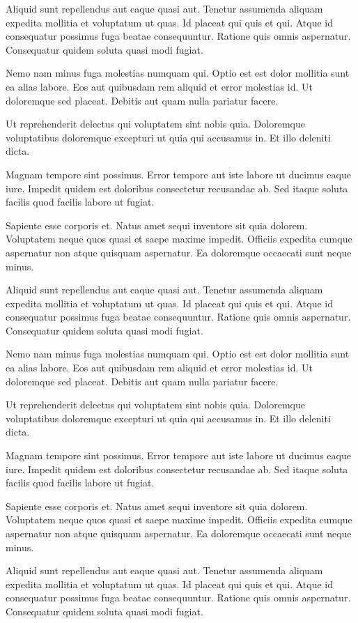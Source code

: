 \documentclass[../Main.tex]{subfiles}
\begin{document}
    Aliquid sunt repellendus aut eaque quasi aut. Tenetur assumenda aliquam expedita mollitia et voluptatum ut quas. Id placeat qui quis et qui. Atque id consequatur possimus fuga beatae consequuntur. Ratione quis omnis aspernatur. Consequatur quidem soluta quasi modi fugiat.

    Nemo nam minus fuga molestias numquam qui. Optio est est dolor mollitia sunt ea alias labore. Eos aut quibusdam rem aliquid et error molestias id. Ut doloremque sed placeat. Debitis aut quam nulla pariatur facere.

    Ut reprehenderit delectus qui voluptatem sint nobis quia. Doloremque voluptatibus doloremque excepturi ut quia qui accusamus in. Et illo deleniti dicta.

    Magnam tempore sint possimus. Error tempore aut iste labore ut ducimus eaque iure. Impedit quidem est doloribus consectetur recusandae ab. Sed itaque soluta facilis quod facilis labore ut fugiat.

    Sapiente esse corporis et. Natus amet sequi inventore sit quia dolorem. Voluptatem neque quos quasi et saepe maxime impedit. Officiis expedita cumque aspernatur non atque quisquam aspernatur. Ea doloremque occaecati sunt neque minus.

    Aliquid sunt repellendus aut eaque quasi aut. Tenetur assumenda aliquam expedita mollitia et voluptatum ut quas. Id placeat qui quis et qui. Atque id consequatur possimus fuga beatae consequuntur. Ratione quis omnis aspernatur. Consequatur quidem soluta quasi modi fugiat.

    Nemo nam minus fuga molestias numquam qui. Optio est est dolor mollitia sunt ea alias labore. Eos aut quibusdam rem aliquid et error molestias id. Ut doloremque sed placeat. Debitis aut quam nulla pariatur facere.

    Ut reprehenderit delectus qui voluptatem sint nobis quia. Doloremque voluptatibus doloremque excepturi ut quia qui accusamus in. Et illo deleniti dicta.

    Magnam tempore sint possimus. Error tempore aut iste labore ut ducimus eaque iure. Impedit quidem est doloribus consectetur recusandae ab. Sed itaque soluta facilis quod facilis labore ut fugiat.

    Sapiente esse corporis et. Natus amet sequi inventore sit quia dolorem. Voluptatem neque quos quasi et saepe maxime impedit. Officiis expedita cumque aspernatur non atque quisquam aspernatur. Ea doloremque occaecati sunt neque minus.

    Aliquid sunt repellendus aut eaque quasi aut. Tenetur assumenda aliquam expedita mollitia et voluptatum ut quas. Id placeat qui quis et qui. Atque id consequatur possimus fuga beatae consequuntur. Ratione quis omnis aspernatur. Consequatur quidem soluta quasi modi fugiat.
\end{document}

